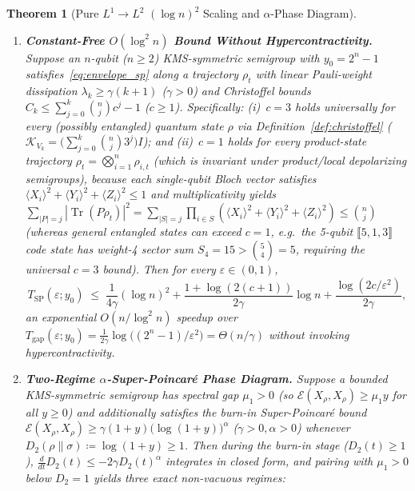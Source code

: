 \documentclass[11pt,a4paper]{article}
\newtheorem{theorem}{Theorem}[section]
\theoremstyle{definition}
\newcommand{\Tr}{\operatorname{Tr}}
\newcommand{\Edir}{\mathcal{E}}
\newcommand{\Kchr}{\mathcal{K}}
\begin{document}
\begin{theorem}[Pure $L^1 \to L^2$ $(\log n)^2$ Scaling and $\alpha$-Phase Diagram]
\label{thm:scaling_phases}
\begin{enumerate}[label=(\alph*),leftmargin=2em,itemsep=2pt]
  \item \textbf{Constant-Free $O(\log^2 n)$ Bound Without Hypercontractivity.} Suppose an $n$-qubit ($n \ge 2$) KMS-symmetric semigroup with $y_0 = 2^n - 1$ satisfies~\eqref{eq:envelope_sp} along a trajectory $\rho_t$ with linear Pauli-weight dissipation $\lambda_k \ge \gamma(k + 1)$ ($\gamma > 0$) and Christoffel bounds $C_k \le \sum_{j=0}^k \binom{n}{j} c^j - 1$ ($c \ge 1$). Specifically: (i)~$c = 3$ holds \emph{universally for every (possibly entangled) quantum state $\rho$} via Definition~\ref{def:christoffel} ($\Kchr_{V_k} = \bigl(\sum_{j=0}^k \binom{n}{j} 3^j\bigr) I$); and (ii)~$c = 1$ holds \emph{for every product-state trajectory} $\rho_t = \bigotimes_{i=1}^n \rho_{i,t}$ (which is invariant under product/local depolarizing semigroups), because each single-qubit Bloch vector satisfies $\langle X_i\rangle^2 + \langle Y_i\rangle^2 + \langle Z_i\rangle^2 \le 1$ and multiplicativity yields $\sum_{|P|=j} |\Tr(P\rho_t)|^2 = \sum_{|S|=j}\prod_{i \in S}(\langle X_i\rangle^2 + \langle Y_i\rangle^2 + \langle Z_i\rangle^2) \le \binom{n}{j}$ (whereas general entangled states can exceed $c=1$, e.g.\ the 5-qubit $\llbracket 5,1,3\rrbracket$ code state has weight-4 sector sum $S_4 = 15 > \binom{5}{4} = 5$, requiring the universal $c=3$ bound). Then for every $\varepsilon \in (0, 1)$,
  \begin{equation}
    T_{\mathrm{SP}}(\varepsilon; y_0) \;\le\;
    \frac{1}{4\gamma}(\log n)^2 + \frac{1 + \log(2(c + 1))}{2\gamma}\log n + \frac{\log(2 c / \varepsilon^2)}{2\gamma},
    \label{eq:log2n_bound}
  \end{equation}
  an exponential $O(n/\log^2 n)$ speedup over $T_{\mathrm{gap}}(\varepsilon; y_0) = \frac{1}{2\gamma}\log\bigl((2^n - 1)/\varepsilon^2\bigr) = \Theta(n/\gamma)$ without invoking hypercontractivity.
  \item \textbf{Two-Regime $\alpha$-Super-Poincar\'e Phase Diagram.} Suppose a bounded KMS-symmetric semigroup has spectral gap $\mu_1 > 0$ (so $\Edir(X_\rho, X_\rho) \ge \mu_1 y$ for all $y \ge 0$) and additionally satisfies the burn-in Super-Poincar\'e bound $\Edir(X_\rho, X_\rho) \ge \gamma(1 + y)\bigl(\log(1 + y)\bigr)^\alpha$ ($\gamma > 0, \alpha > 0$) whenever $D_2(\rho\|\sigma) \coloneqq \log(1 + y) \ge 1$. Then during the burn-in stage ($D_2(t) \ge 1$), $\frac{d}{dt}D_2(t) \le -2\gamma D_2(t)^\alpha$ integrates in closed form, and pairing with $\mu_1 > 0$ below $D_2 = 1$ yields three exact non-vacuous regimes:

\end{enumerate}
\end{theorem}
\end{document}
